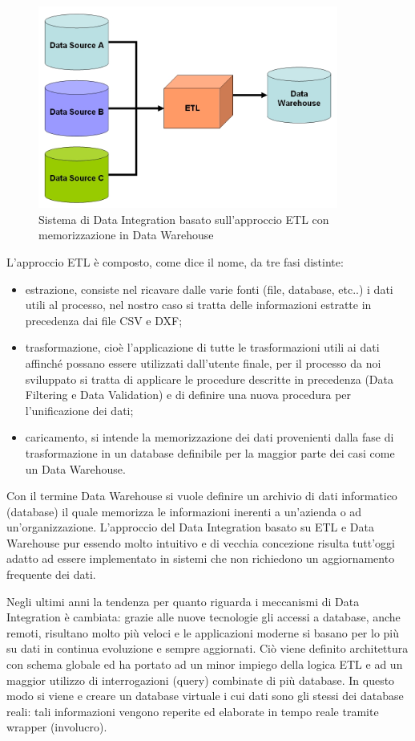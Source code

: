 \documentclass[12pt]{report}
\begin{document}
\begin{figure}[H]
    \centering
    \includegraphics[width=280pt]{ETL+Datawarehouse.jpg}
    \caption{Sistema di Data Integration basato sull'approccio ETL con memorizzazione in Data Warehouse}
    \label{fig:ETL_Datawarehouse}
\end{figure}


L'approccio ETL è composto, come dice il nome, da tre fasi distinte:
\begin{itemize}
\item estrazione, consiste nel ricavare dalle varie fonti (file, database, etc..) i dati utili al processo, nel nostro caso si tratta delle informazioni estratte in precedenza dai file CSV e DXF;
\item trasformazione, cioè l'applicazione di tutte le trasformazioni utili ai dati affinché possano essere utilizzati dall'utente finale, per il processo da noi sviluppato si tratta di applicare le procedure descritte in precedenza (Data Filtering e Data Validation) e di definire una nuova procedura per l'unificazione dei dati;
\item caricamento, si intende la memorizzazione dei dati provenienti dalla fase di trasformazione in un database definibile per la maggior parte dei casi come un Data Warehouse.
\end{itemize}


Con il termine Data Warehouse si vuole definire un archivio di dati informatico (database) il quale memorizza le informazioni inerenti a un'azienda o ad un'organizzazione.
L'approccio del Data Integration basato su ETL e Data Warehouse pur essendo molto intuitivo e di vecchia concezione risulta tutt'oggi adatto ad essere implementato in sistemi che non richiedono un aggiornamento frequente dei dati.

Negli ultimi anni la tendenza per quanto riguarda i meccanismi di Data Integration è cambiata: grazie alle nuove tecnologie gli accessi a database, anche remoti, risultano molto più veloci e le applicazioni moderne si basano per lo più su dati in continua evoluzione e sempre aggiornati.
Ciò viene definito architettura con schema globale ed ha portato ad un minor impiego della logica ETL e ad un maggior utilizzo di interrogazioni (query) combinate di più database.
In questo modo si viene e creare un database virtuale i cui dati sono gli stessi dei database reali: tali informazioni vengono reperite ed elaborate in tempo reale tramite wrapper (involucro).
\end{document}

